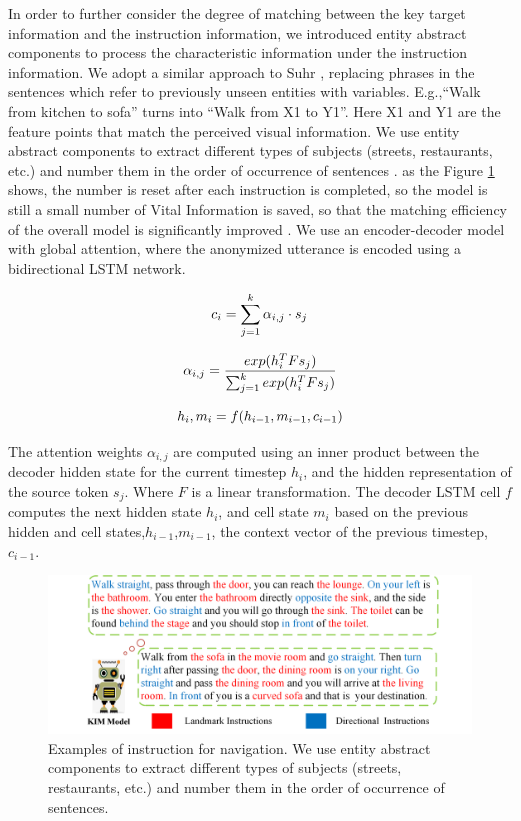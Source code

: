 In order to further consider the degree of matching between the key target information and the instruction information, we introduced entity abstract components to process the characteristic information under the instruction information. We adopt a similar approach to Suhr \cite{suhr2018learning}, replacing phrases in the sentences which refer to previously unseen entities with variables. E.g.,“Walk from kitchen to sofa” turns into “Walk from X1 to Y1”. Here X1 and Y1 are the feature points that match the perceived visual information. We use entity abstract components to extract different types of subjects (streets, restaurants, etc.) and number them in the order of occurrence of sentences \cite{paz2019run}. as the Figure \ref{image05} shows, the number is reset after each instruction is completed, so the model is still a small number of Vital Information is saved, so that the matching efficiency of the overall model is significantly improved \cite{iyer2017learning}. We use an encoder-decoder model with global attention, where the anonymized utterance is encoded using a bidirectional LSTM network.

\begin{equation}
	\centering
	{c}_{i} = \displaystyle\sum_{j=1}^k {\alpha}_{i, j} \cdot s_{j}
\end{equation}

\begin{equation}
	\centering
	{\alpha}_{i, j} = {\frac{exp({h_{i}^{T}Fs_{j}})}{\sum_{j=1}^{k}exp({h_{i}^{T}Fs_{j}})}}
\end{equation}

\begin{equation}
	\centering
	{h}_{i}, {m}_{i} = f({h}_{i-1}, {m}_{i-1}, {c}_{i-1})
\end{equation}

The attention weights ${\alpha}_{i, j}$ are computed using an inner product between the decoder hidden state for the current timestep ${h}_{i}$, and the hidden representation of the source token ${s}_{j}$. Where ${F}$ is a linear transformation. The decoder LSTM cell ${f}$ computes the next hidden state ${h}_{i}$, and cell state ${m}_{i}$ based on the previous hidden and cell states,${h}_{i-1}$,${m}_{i-1}$, the context vector of the previous timestep, ${c}_{i-1}$.

\begin{figure}[h]
	\centering
	\includegraphics[scale=1]{image05.png}
	\caption{Examples of instruction for navigation. We use entity abstract components to extract different types of subjects (streets, restaurants, etc.) and number them in the order of occurrence of sentences.}
	\label{image05}
\end{figure}
\vspace{-2em}
	
